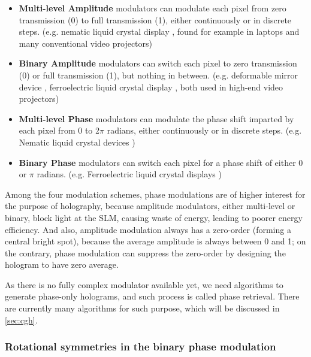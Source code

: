 \begin{itemize}
  \item \textbf{Multi-level Amplitude} modulators can modulate each pixel from zero transmission (0) to full transmission (1), either continuously or in discrete steps. (e.g. nematic liquid crystal display \cite{Schadt1971}, found for example in laptops and many conventional video projectors)
  \item \textbf{Binary Amplitude} modulators can switch each pixel to zero transmission (0) or full transmission (1), but nothing in between. (e.g. deformable mirror device \cite{Pape1983}, ferroelectric liquid crystal display \cite{Johnson1993}, both used in high-end video projectors)
  \item \textbf{Multi-level Phase} modulators can modulate the phase shift imparted by each pixel from 0 to 2$\pi$ radians, either continuously or in discrete steps. (e.g. Nematic liquid crystal devices \cite{Lee2004})
  \item \textbf{Binary Phase} modulators can switch each pixel for a phase shift of either 0 or $\pi$ radians. (e.g. Ferroelectric liquid crystal displays \cite{Broomfield1992})
\end{itemize}

Among the four modulation schemes, phase modulations are of higher interest for the purpose of holography, because amplitude modulators, either multi-level or binary, block light at the SLM, causing waste of energy, leading to poorer energy efficiency. And also, amplitude modulation always has a zero-order (forming a central bright spot), because the average amplitude is always between 0 and 1; on the contrary, phase modulation can suppress the zero-order by designing the hologram to have zero average.

As there is no fully complex modulator available yet, we need algorithms to generate phase-only holograms, and such process is called phase retrieval. There are currently many algorithms for such purpose, which will be discussed in \cref{sec:cgh}.

\subsubsection{Rotational symmetries in the binary phase modulation} \label{sec:Rotational symmetries in the binary phase modulation}

